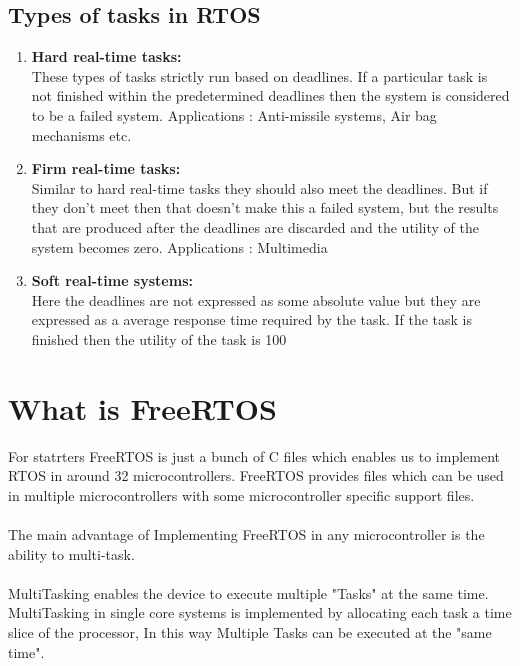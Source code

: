 \documentclass[11pt,a4paper]{book}
\begin{document}
	\subsection{Types of tasks in RTOS}
	\begin{enumerate}
		
		
		\item\textbf{Hard real-time tasks:}\\
		These types of tasks strictly run based on deadlines.
		If a particular task is not finished within the predetermined deadlines  then the system is considered to be a failed system.
		Applications : Anti-missile systems, Air bag mechanisms etc.
		
		\item\textbf{Firm real-time tasks:}\\
		Similar  to hard real-time tasks they should also meet the deadlines.
		But if they don't meet then that doesn't make this a failed system, but the results that are produced after the deadlines are discarded and the utility of the system becomes zero.
		Applications : Multimedia
		
		\item\textbf{Soft real-time systems:}\\
		Here the deadlines are not expressed as some absolute value but they are expressed as a average response time required by the task.
		If the task is finished then the utility of the task is 100%
	\end{enumerate}
\newpage	
	\section{What is FreeRTOS}
	
	For statrters FreeRTOS is just a bunch of C files which enables us to implement RTOS in around 32 microcontrollers. FreeRTOS provides files which can be used in multiple microcontrollers with some microcontroller specific support files.
	\\
	\\   
	The main advantage of Implementing FreeRTOS in any microcontroller is the ability to multi-task.
	\\
	\\
	MultiTasking enables the device to execute multiple "Tasks" at the same time.
	MultiTasking in single core systems is implemented by allocating each task a time slice of the processor, In this way Multiple Tasks can be executed at the "same time".
	\\
	\\
\end{document}
